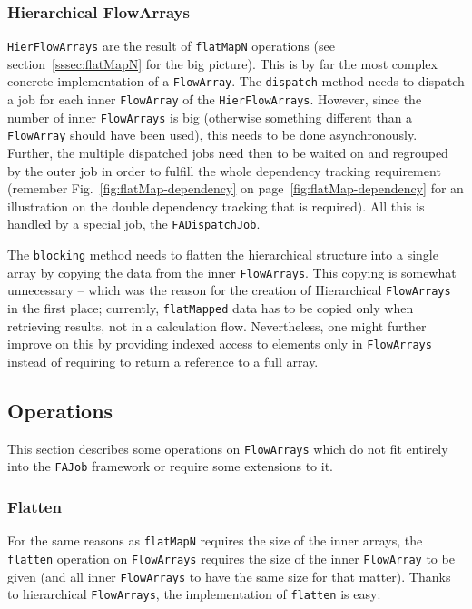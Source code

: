 \documentclass[runningheads,a4paper,fleqn]{llncs}
\begin{document}

\subsubsection{Hierarchical FlowArrays}
\texttt{HierFlowArrays} are the result of \texttt{flatMapN} operations
(see section~\ref{sssec:flatMapN} for the big picture). This is by far
the most complex concrete implementation of a \texttt{FlowArray}. The
\texttt{dispatch} method needs to dispatch a job for each inner
\texttt{FlowArray} of the \texttt{HierFlowArrays}. However, since the number of
inner \texttt{FlowArrays} is big (otherwise something different than a \texttt{FlowArray}
should have been used), 
this needs to be done asynchronously. Further, the multiple dispatched
jobs need then to be waited on and regrouped by the outer job in order
to fulfill the whole dependency tracking requirement (remember
Fig.~\ref{fig:flatMap-dependency} on
page~\ref{fig:flatMap-dependency} for an illustration on the
double dependency tracking that is required). All this is handled by a 
special job, the \texttt{FADispatchJob}.

The \texttt{blocking} method needs to flatten the hierarchical
structure into a single array by copying the data from the inner
\texttt{FlowArrays}. This copying is somewhat unnecessary -- which 
was the reason for the creation of Hierarchical \texttt{FlowArrays} in the
first place; currently, \texttt{flatMapped} data has to be copied only when
retrieving results, not in a calculation flow. Nevertheless, one might
further improve on this by providing indexed access to elements only
in \texttt{FlowArrays} instead of requiring to return a reference to a full
array.

\subsection{Operations}
\label{ssec:imp-operations}
This section describes some operations on \texttt{FlowArrays} which do not fit
entirely into the \texttt{FAJob} framework or require some extensions
to it.

\subsubsection{Flatten}
For the same reasons as \texttt{flatMapN} requires the size of the
inner arrays, the \texttt{flatten} operation on \texttt{FlowArrays} requires
the size of the inner \texttt{FlowArray} to be given (and all inner \texttt{FlowArrays}
to have the same size for that matter). Thanks to hierarchical
\texttt{FlowArrays}, the implementation of \texttt{flatten} is easy:
\end{document}
